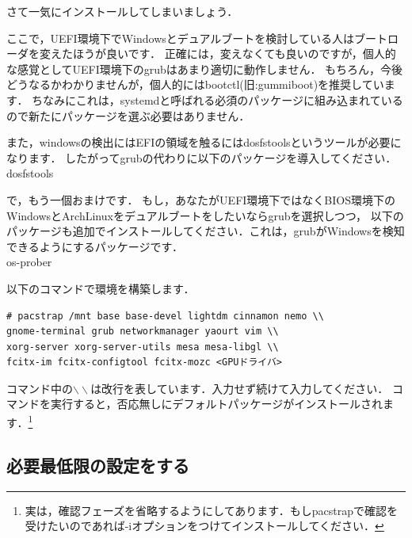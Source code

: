 \documentclass[b5j,twoside,openany]{jsbook}
\begin{document}
      さて一気にインストールしてしまいましょう．

      \begin{boxnote}
        ここで，UEFI環境下でWindowsとデュアルブートを検討している人はブートローダを変えたほうが良いです．
        正確には，変えなくても良いのですが，個人的な感覚としてUEFI環境下のgrubはあまり適切に動作しません．
        もちろん，今後どうなるかわかりませんが，個人的にはbootctl(旧:gummiboot)を推奨しています．
        ちなみにこれは，systemdと呼ばれる必須のパッケージに組み込まれているので新たにパッケージを選ぶ必要はありません．

        また，windowsの検出にはEFIの領域を触るにはdosfstoolsというツールが必要になります．
        したがってgrubの代わりに以下のパッケージを導入してください．\\

        dosfstools
      \end{boxnote}
      \begin{boxnote}
        で，もう一個おまけです．
        もし，あなたがUEFI環境下ではなくBIOS環境下のWindowsとArchLinuxをデュアルブートをしたいならgrubを選択しつつ，
        以下のパッケージも追加でインストールしてください．これは，grubがWindowsを検知できるようにするパッケージです．\\
        os-prober
      \end{boxnote}
      以下のコマンドで環境を構築します．
      \begin{screen}
\begin{verbatim}
# pacstrap /mnt base base-devel lightdm cinnamon nemo \\
gnome-terminal grub networkmanager yaourt vim \\ 
xorg-server xorg-server-utils mesa mesa-libgl \\
fcitx-im fcitx-configtool fcitx-mozc <GPUドライバ>
\end{verbatim}
      \end{screen}
      コマンド中の$\backslash\backslash$は改行を表しています．入力せず続けて入力してください．
      コマンドを実行すると，否応無しにデフォルトパッケージがインストールされます．\footnote{実は，確認フェーズを省略するようにしてあります．もしpacstrapで確認を受けたいのであれば-iオプションをつけてインストールしてください．}
    \subsection{必要最低限の設定をする}
\end{document}
